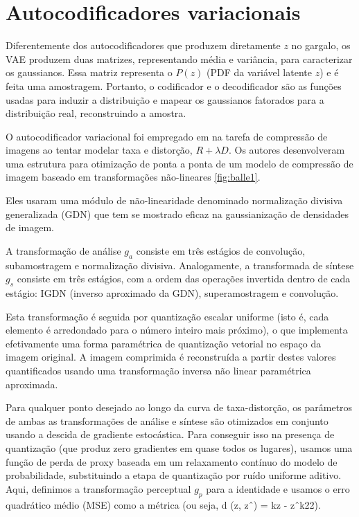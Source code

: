 
\section{Autocodificadores variacionais}



Diferentemente dos autocodificadores que produzem diretamente $z$ no gargalo, os VAE produzem duas matrizes, representando média e variância, para caracterizar os gaussianos. Essa matriz representa o $P(z)$ (PDF da variável latente $z$) e é feita uma amostragem. Portanto, o codificador e o decodificador são as funções usadas para induzir a distribuição e mapear os gaussianos fatorados para a distribuição real, reconstruindo a amostra.


O autocodificador variacional foi empregado em  \cite{End2016Balle} na tarefa de compressão de imagens ao tentar modelar taxa e distorção, $R +\lambda D$. Os autores desenvolveram uma estrutura para otimização de ponta a ponta de um modelo de compressão de imagem baseado em transformações não-lineares \ref{fig:balle1}. 

Eles usaram uma módulo de não-linearidade denominado normalização divisiva generalizada (GDN) que tem se mostrado eficaz na gaussianização de densidades de imagem. 


A transformação de análise $g_a$ consiste em três estágios de convolução, subamostragem e normalização divisiva. Analogamente, a transformada de síntese $g_s$ consiste em três estágios, com a ordem das operações invertida dentro de cada estágio: IGDN (inverso aproximado da GDN), superamostragem e convolução.


Esta transformação é seguida por quantização escalar uniforme (isto é, cada elemento é arredondado para o número inteiro mais próximo), o que implementa efetivamente uma forma paramétrica de quantização vetorial no espaço da imagem original. 
A imagem comprimida é reconstruída a partir destes valores quantificados usando uma transformação inversa não linear paramétrica aproximada.

Para qualquer ponto desejado ao longo da curva de taxa-distorção, os parâmetros de ambas as transformações de análise e síntese são otimizados em conjunto usando a descida de gradiente estocástica. Para conseguir isso na presença de quantização (que produz zero gradientes em quase todos os lugares), usamos uma função de perda de proxy baseada em um relaxamento contínuo do modelo de probabilidade, substituindo a etapa de quantização por ruído uniforme aditivo. 
Aqui, definimos a transformação perceptual $g_p$ para a identidade e usamos o erro quadrático médio (MSE) como a métrica (ou seja, d (z, zˆ) = kz - zˆk22). 

